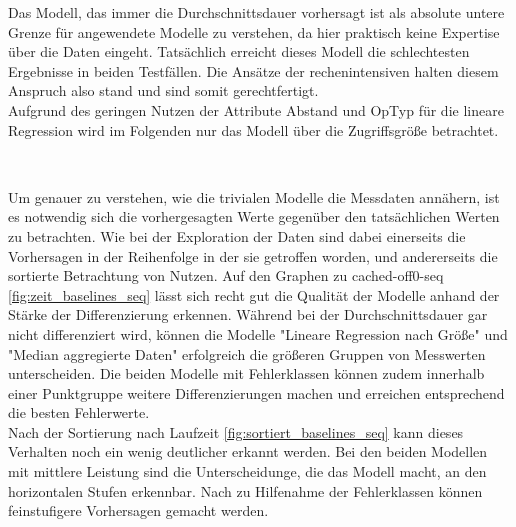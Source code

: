 \documentclass[
	12pt,
	a4paper,
	BCOR10mm,
	DIV14,
	listof=totoc,
	bibliography=totoc,
	headsepline
]{scrreprt}
\begin{document}
Das Modell, das immer die Durchschnittsdauer vorhersagt ist als absolute untere Grenze für angewendete Modelle zu verstehen, da hier praktisch keine Expertise über die Daten eingeht. 
Tatsächlich erreicht dieses Modell die schlechtesten Ergebnisse in beiden Testfällen. Die Ansätze der rechenintensiven halten diesem Anspruch also stand und sind somit gerechtfertigt. \\
Aufgrund des geringen Nutzen der Attribute Abstand und OpTyp für die lineare Regression wird im Folgenden nur das Modell über die Zugriffsgröße betrachtet.\\

\begin{table}
	\scriptsize
	 \\
	\caption{Ergebnisse der trivialen Modelle}
	\label{tab:triv}
\end{table}
Um genauer zu verstehen, wie die trivialen Modelle die Messdaten annähern, ist es notwendig sich die vorhergesagten Werte gegenüber den tatsächlichen Werten zu betrachten. Wie bei der Exploration der Daten sind dabei einerseits die Vorhersagen in der Reihenfolge in der sie getroffen worden, und andererseits die sortierte Betrachtung von Nutzen.  
Auf den Graphen zu cached-off0-seq \ref{fig:zeit_baselines_seq} lässt sich recht gut die Qualität der Modelle anhand der Stärke der Differenzierung erkennen. Während bei der Durchschnittsdauer gar nicht differenziert wird, können die Modelle "Lineare Regression nach Größe" und "Median aggregierte Daten" erfolgreich die größeren Gruppen von Messwerten unterscheiden. 
Die beiden Modelle mit Fehlerklassen können zudem innerhalb einer Punktgruppe weitere Differenzierungen machen und erreichen entsprechend die besten Fehlerwerte.\\
Nach der Sortierung nach Laufzeit \ref{fig:sortiert_baselines_seq} kann dieses Verhalten noch ein wenig deutlicher erkannt werden. Bei den beiden Modellen mit mittlere Leistung sind die Unterscheidunge, die das Modell macht, an den horizontalen Stufen erkennbar. Nach zu Hilfenahme der Fehlerklassen können feinstufigere Vorhersagen gemacht werden.
\end{document}
